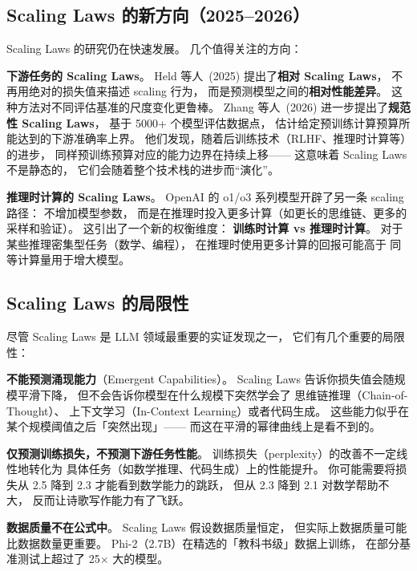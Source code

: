 \subsection{Scaling Laws 的新方向（2025--2026）}

Scaling Laws 的研究仍在快速发展。
几个值得关注的方向：

\textbf{下游任务的 Scaling Laws}。
Held 等人~(2025) 提出了\textbf{相对 Scaling Laws}，%
不再用绝对的损失值来描述 scaling 行为，
而是预测模型之间的\textbf{相对性能差异}。
这种方法对不同评估基准的尺度变化更鲁棒。
Zhang 等人~(2026) 进一步提出了\textbf{规范性 Scaling Laws}，%
基于 5000+ 个模型评估数据点，
估计给定预训练计算预算所能达到的下游准确率上界。
他们发现，随着后训练技术（RLHF、推理时计算等）的进步，
同样预训练预算对应的能力边界在持续上移——
这意味着 Scaling Laws 不是静态的，
它们会随着整个技术栈的进步而``演化''。

\textbf{推理时计算的 Scaling Laws}。
OpenAI 的 o1/o3 系列模型开辟了另一条 scaling 路径：
不增加模型参数，
而是在推理时投入更多计算（如更长的思维链、更多的采样和验证）。
这引出了一个新的权衡维度：
\textbf{训练时计算 vs 推理时计算}。
对于某些推理密集型任务（数学、编程），
在推理时使用更多计算的回报可能高于
同等计算量用于增大模型。

\subsection{Scaling Laws 的局限性}

尽管 Scaling Laws 是 LLM 领域最重要的实证发现之一，
它们有几个重要的局限性：

\textbf{不能预测涌现能力}（Emergent Capabilities）。
Scaling Laws 告诉你损失值会随规模平滑下降，
但不会告诉你模型在什么规模下突然学会了
思维链推理（Chain-of-Thought）、
上下文学习（In-Context Learning）或者代码生成。
这些能力似乎在某个规模阈值之后「突然出现」——
而这在平滑的幂律曲线上是看不到的。

\textbf{仅预测训练损失，不预测下游任务性能}。
训练损失（perplexity）的改善不一定线性地转化为
具体任务（如数学推理、代码生成）上的性能提升。
你可能需要将损失从 2.5 降到 2.3 才能看到数学能力的跳跃，
但从 2.3 降到 2.1 对数学帮助不大，
反而让诗歌写作能力有了飞跃。

\textbf{数据质量不在公式中}。
Scaling Laws 假设数据质量恒定，
但实际上数据质量可能比数据数量更重要。
Phi-2（2.7B）在精选的「教科书级」数据上训练，
在部分基准测试上超过了 25$\times$ 大的模型。

